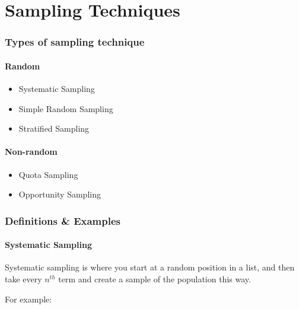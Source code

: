 \documentclass[
]{article}
\author{}
\date{}
\begin{document}
\hypertarget{sampling-techniques}{%
\section{Sampling Techniques}\label{sampling-techniques}}

\hypertarget{types-of-sampling-technique}{%
\subsubsection{Types of sampling
technique}\label{types-of-sampling-technique}}

\hypertarget{random}{%
\paragraph{Random}\label{random}}

\begin{itemize}
\item
  Systematic Sampling
\item
  Simple Random Sampling
\item
  Stratified Sampling
\end{itemize}

\hypertarget{non-random}{%
\paragraph{Non-random}\label{non-random}}

\begin{itemize}
\item
  Quota Sampling
\item
  Opportunity Sampling
\end{itemize}

\hypertarget{definitions-examples}{%
\subsubsection{Definitions \& Examples}\label{definitions-examples}}

\hypertarget{systematic-sampling}{%
\paragraph{Systematic Sampling}\label{systematic-sampling}}

Systematic sampling is where you start at a random position in a list,
and then take every \(n^{th} \text{ term}\) and create a sample of the
population this way.

For example:
\end{document}
